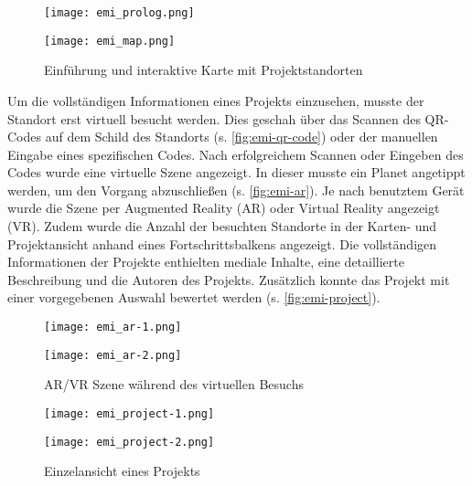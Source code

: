 \begin{figure}[htpb]
    \begin{minipage}{.5\textwidth}
        \centering
        \texttt{[image: emi\_prolog.png]}
    \end{minipage}%
    \begin{minipage}{.5\textwidth}
        \centering
        \texttt{[image: emi\_map.png]}
    \end{minipage}
    \caption{Einführung und interaktive Karte mit Projektstandorten}
    \label{fig:emi-intro-map}
\end{figure}

Um die vollständigen Informationen eines Projekts einzusehen, musste der
Standort erst virtuell besucht werden. Dies geschah über das Scannen des
QR-Codes auf dem Schild des Standorts (s. \autoref{fig:emi-qr-code}) oder der
manuellen Eingabe eines spezifischen Codes. Nach erfolgreichem Scannen oder
Eingeben des Codes wurde eine virtuelle Szene angezeigt. In dieser musste ein
Planet angetippt werden, um den Vorgang abzuschließen (s. \autoref{fig:emi-ar}).
Je nach benutztem Gerät wurde die Szene per Augmented Reality (AR) oder Virtual
Reality angezeigt (VR). Zudem wurde die Anzahl der besuchten Standorte in der
Karten- und Projektansicht anhand eines Fortschrittsbalkens angezeigt. Die
vollständigen Informationen der Projekte enthielten mediale Inhalte, eine
detaillierte Beschreibung und die Autoren des Projekts. Zusätzlich konnte das
Projekt mit einer vorgegebenen Auswahl bewertet werden (s.
\autoref{fig:emi-project}).

\begin{figure}[htpb]
    \begin{minipage}{.5\textwidth}
        \centering
        \texttt{[image: emi\_ar-1.png]}
    \end{minipage}%
    \begin{minipage}{.5\textwidth}
        \centering
        \texttt{[image: emi\_ar-2.png]}
    \end{minipage}
    \caption{AR/VR Szene während des virtuellen Besuchs}
    \label{fig:emi-ar}
\end{figure}

\begin{figure}[htpb]
    \begin{minipage}{.5\textwidth}
        \centering
        \texttt{[image: emi\_project-1.png]}
    \end{minipage}%
    \begin{minipage}{.5\textwidth}
        \centering
        \texttt{[image: emi\_project-2.png]}
    \end{minipage}
    \caption{Einzelansicht eines Projekts}
    \label{fig:emi-project}
\end{figure}

